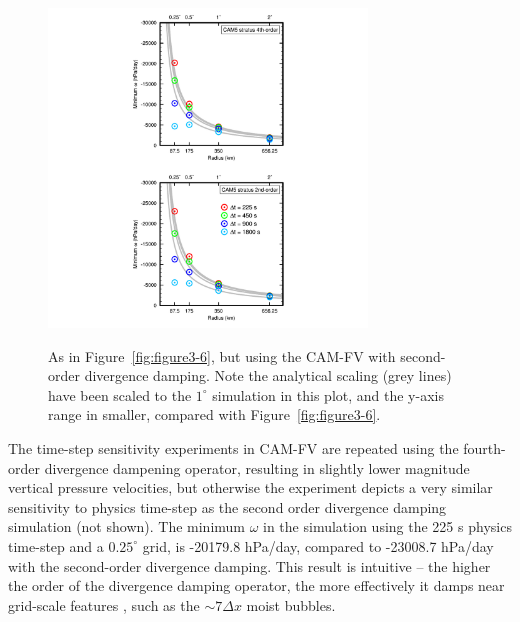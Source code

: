\begin{figure}[t]
\begin{center}
\noindent\includegraphics[width=20pc,angle=0]{chapter3/Figure7_crop.pdf}\\
\end{center}
\caption{As in Figure~\ref{fig:figure3-6}, but using the CAM-FV with second-order divergence damping. Note the analytical scaling (grey lines) have been scaled to the $1^{\circ}$ simulation in this plot, and the y-axis range in smaller, compared with Figure~\ref{fig:figure3-6}.}
\label{fig:figure3-7}
\end{figure}

The time-step sensitivity experiments in CAM-FV are repeated using the fourth-order divergence dampening operator, resulting in slightly lower magnitude vertical pressure velocities, but otherwise the experiment depicts a very similar sensitivity to physics time-step as the second order divergence damping simulation (not shown). The minimum $\omega$ in the simulation using the 225 s physics time-step and a $0.25^{\circ}$ grid, is -20179.8 hPa/day, compared to -23008.7 hPa/day with the second-order divergence damping. This result is intuitive – the higher the order of the divergence damping operator, the more effectively it damps near grid-scale features \citep{WJRL2010MWR}, such as the $\sim 7 \Delta x$ moist bubbles.

